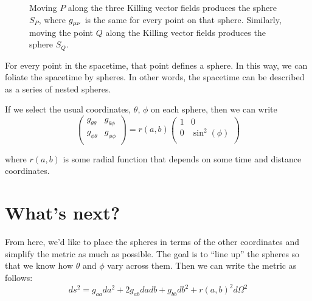 \documentclass[11pt,table]{article}
\begin{document}
\begin{figure}[h]
  \caption{Moving $P$ along the three Killing vector fields produces the sphere $S_P$, where $\tensor{g}{_\mu_\nu}$ is the same for every point on that sphere. Similarly, moving the point $Q$ along the Killing vector fields produces the sphere $S_Q$.}
  \label{fig:spheres}
\end{figure}

For every point in the spacetime, that point defines a sphere. In this way, we can foliate the spacetime by spheres. In other words, the spacetime can be described as a series of nested spheres.

If we select the usual coordinates, $\theta$, $\phi$ on each sphere, then we can write
\[ \begin{pmatrix}
  g_{\theta\theta} & g_{\theta\phi} \\
  g_{\phi\theta} & g_{\phi\phi} \\
\end{pmatrix}
= r(a,b) \begin{pmatrix}
  1 & 0 \\
  0 & \sin^2(\phi) \\
\end{pmatrix}  \]

where $r(a,b)$ is some radial function that depends on some time and distance coordinates.

\section{What's next?}

From here, we'd like to place the spheres in terms of the other coordinates and simplify the metric as much as possible. The goal is to ``line up'' the spheres so that we know how $\theta$ and $\phi$ vary across them. Then we can write the metric as follows:
\begin{equation}\label{eq:metric}
  ds^2 = g_{aa}da^2 + 2g_{ab}dadb + g_{bb}db^2 + r(a,b)^2d\Omega^2
\end{equation}
\end{document}
